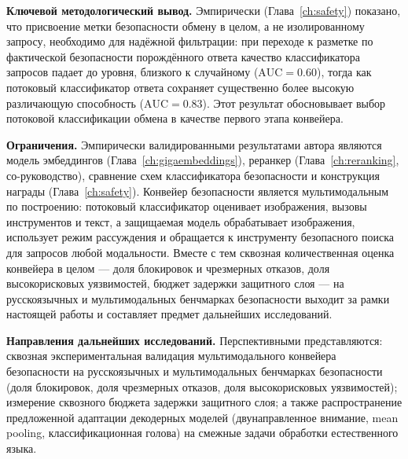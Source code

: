 \textbf{Ключевой методологический вывод.} Эмпирически (Глава~\ref{ch:safety}) показано, что присвоение метки безопасности обмену в целом, а не изолированному запросу, необходимо для надёжной фильтрации: при переходе к разметке по фактической безопасности порождённого ответа качество классификатора запросов падает до уровня, близкого к случайному ($\mathrm{AUC} = 0.60$), тогда как потоковый классификатор ответа сохраняет существенно более высокую различающую способность ($\mathrm{AUC} = 0.83$). Этот результат обосновывает выбор потоковой классификации обмена в качестве первого этапа конвейера.

\textbf{Ограничения.} Эмпирически валидированными результатами автора являются модель эмбеддингов (Глава~\ref{ch:gigaembeddings}), реранкер (Глава~\ref{ch:reranking}, со-руководство), сравнение схем классификатора безопасности и конструкция награды (Глава~\ref{ch:safety}). Конвейер безопасности является мультимодальным по построению: потоковый классификатор оценивает изображения, вызовы инструментов и текст, а защищаемая модель обрабатывает изображения, использует режим рассуждения и обращается к инструменту безопасного поиска для запросов любой модальности. Вместе с тем сквозная количественная оценка конвейера в целом --- доля блокировок и чрезмерных отказов, доля высокорисковых уязвимостей, бюджет задержки защитного слоя --- на русскоязычных и мультимодальных бенчмарках безопасности выходит за рамки настоящей работы и составляет предмет дальнейших исследований.

\textbf{Направления дальнейших исследований.} Перспективными представляются: сквозная экспериментальная валидация мультимодального конвейера безопасности на русскоязычных и мультимодальных бенчмарках безопасности (доля блокировок, доля чрезмерных отказов, доля высокорисковых уязвимостей); измерение сквозного бюджета задержки защитного слоя; а также распространение предложенной адаптации декодерных моделей (двунаправленное внимание, mean pooling, классификационная голова) на смежные задачи обработки естественного языка.
